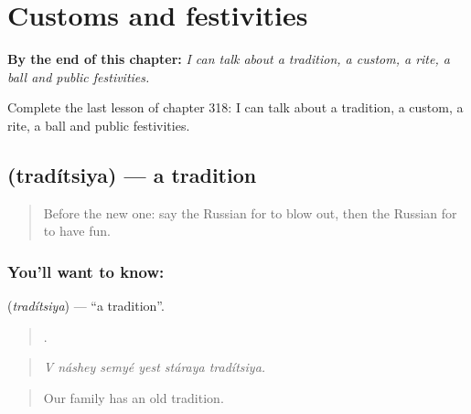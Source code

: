 
\chapter{Customs and festivities}
\label{ch:ru-customs-and-festivities}

\begin{chapteropening}
\textbf{By the end of this chapter:} \emph{I can talk about a tradition, a custom, a rite, a ball and public festivities.}

Complete the last lesson of chapter 318: I can talk about a tradition, a custom, a rite, a ball and public festivities.
\end{chapteropening}

\section[\texorpdfstring{\ru{традиция} (tradítsiya)}{традиция (tradítsiya)}]{ (tradítsiya) — a tradition}

\label{lesson:RU-C318-traditsiya}



\begin{quote}
Before the new one: say the Russian for to blow out, then the Russian for to have fun.
\end{quote}

\subsection*{You'll want to know: }
\textbf{} (\emph{tradítsiya}) — \textquotedblleft{}a tradition\textquotedblright{}.

\begin{quote}
     .
\end{quote}

\begin{quote}
\emph{V náshey semyé yest stáraya tradítsiya.}
\end{quote}

\begin{quote}
Our family has an old tradition.
\end{quote}

